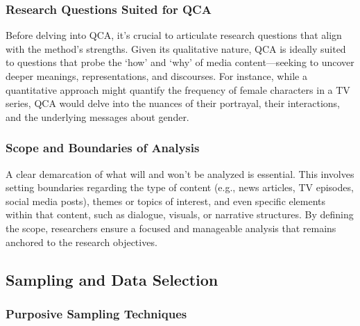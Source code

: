 \documentclass[
  b5paper]{book}
\begin{document}
\hypertarget{research-questions-suited-for-qca}{%
\subsubsection*{Research Questions Suited for QCA}\label{research-questions-suited-for-qca}}

Before delving into QCA, it's crucial to articulate research questions that align with the method's strengths. Given its qualitative nature, QCA is ideally suited to questions that probe the `how' and `why' of media content---seeking to uncover deeper meanings, representations, and discourses. For instance, while a quantitative approach might quantify the frequency of female characters in a TV series, QCA would delve into the nuances of their portrayal, their interactions, and the underlying messages about gender.

\hypertarget{scope-and-boundaries-of-analysis}{%
\subsubsection*{Scope and Boundaries of Analysis}\label{scope-and-boundaries-of-analysis}}

A clear demarcation of what will and won't be analyzed is essential. This involves setting boundaries regarding the type of content (e.g., news articles, TV episodes, social media posts), themes or topics of interest, and even specific elements within that content, such as dialogue, visuals, or narrative structures. By defining the scope, researchers ensure a focused and manageable analysis that remains anchored to the research objectives.

\hypertarget{sampling-and-data-selection}{%
\subsection*{Sampling and Data Selection}\label{sampling-and-data-selection}}

\hypertarget{purposive-sampling-techniques}{%
\subsubsection*{Purposive Sampling Techniques}\label{purposive-sampling-techniques}}
\end{document}
